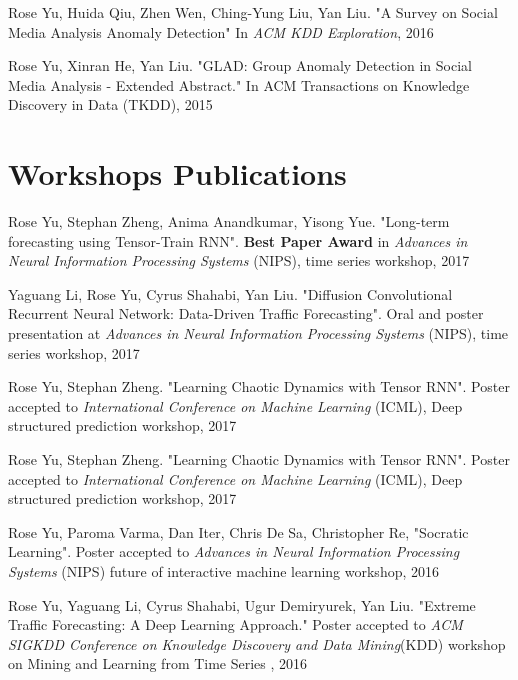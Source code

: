 \documentclass[margin,line]{res}
\begin{document}
\begin{resume}
\begin{enumerate}[label={[J\arabic*]}]
\item Rose Yu, Huida Qiu, Zhen Wen, Ching-Yung Liu,  Yan Liu. "A Survey on Social Media Analysis  Anomaly Detection" In \textit{ACM KDD Exploration},  2016

\item Rose Yu, Xinran He, Yan Liu. "GLAD: Group Anomaly Detection in Social Media Analysis - Extended Abstract." In \textit{}ACM Transactions on Knowledge Discovery in Data  (TKDD), 2015
\end{enumerate}

\section{\sc Workshops Publications}
\begin{enumerate}[label={[W\arabic*]}]
\item Rose Yu, Stephan Zheng, Anima Anandkumar, Yisong Yue. "Long-term forecasting using Tensor-Train RNN". \textbf{Best Paper Award}  in \textit{Advances in Neural Information Processing Systems} (NIPS), time series workshop, 2017


\item Yaguang Li, Rose Yu, Cyrus Shahabi, Yan Liu. "Diffusion Convolutional Recurrent Neural Network: Data-Driven Traffic Forecasting". Oral and poster presentation at \textit{Advances in Neural Information Processing Systems} (NIPS), time series workshop, 2017


\item Rose Yu, Stephan Zheng. "Learning Chaotic Dynamics with Tensor RNN". Poster accepted to \textit{International Conference on Machine Learning} (ICML), Deep structured prediction workshop, 2017

\item Rose Yu, Stephan Zheng. "Learning Chaotic Dynamics with Tensor RNN". Poster accepted to \textit{International Conference on Machine Learning} (ICML), Deep structured prediction workshop, 2017

\item Rose Yu,  Paroma Varma, Dan Iter, Chris De Sa, Christopher Re,  "Socratic Learning".  Poster accepted to \textit{Advances in Neural Information Processing Systems}  (NIPS) future of interactive machine learning workshop, 2016


\item Rose Yu, Yaguang Li, Cyrus Shahabi, Ugur Demiryurek, Yan Liu. "Extreme Traffic Forecasting: A Deep Learning Approach." Poster accepted to \textit{ACM SIGKDD Conference on Knowledge Discovery and Data Mining}(KDD)  workshop on Mining and Learning from Time Series , 2016



\end{enumerate}
\end{resume}
\end{document}
